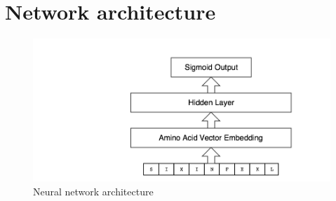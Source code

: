 
\section{Network architecture}

\begin{figure}[h]
\centering
\includegraphics[scale=0.25]{figures/mhcflurry-gliffy-network.png}
\caption{Neural network architecture}
\end{figure}
